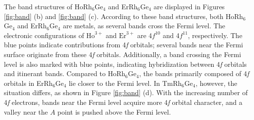 \documentclass[preprint,12pt]{elsarticle}
\begin{document}
The band structures of HoRh$_6$Ge$_4$ and ErRh$_6$Ge$_4$ are displayed in Figures \ref{fig:band} (b) and \ref{fig:band} (c). According to these band structures, both HoRh$_6$Ge$_4$ and ErRh$_6$Ge$_4$ are metals, as several bands cross the Fermi level. The electronic configurations of $\mathrm{Ho}^{3+}$ and $\mathrm{Er}^{3+}$ are 4$f^{10}$ and 4$f^{11}$, respectively. The blue points indicate contributions from 4\textit{f} orbitals; several bands near the Fermi surface originate from these 4\textit{f} orbitals. Additionally, a band crossing the Fermi level is also marked with blue points, indicating hybridization between 4\textit{f} orbitals and itinerant bands. Compared to HoRh$_6$Ge$_4$, the bands primarily composed of 4\textit{f} orbitals in ErRh$_6$Ge$_4$ lie closer to the Fermi level. In TmRh$_6$Ge$_4$, however, the situation differs, as shown in Figure \ref{fig:band} (d). With the increasing number of 4\textit{f} electrons, bands near the Fermi level acquire more 4\textit{f} orbital character, and a valley near the $A$ point is pushed above the Fermi level.

\end{document}
